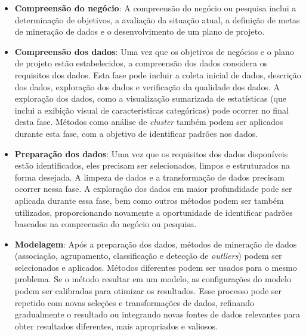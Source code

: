 \begin{itemize}
  \item 
\textbf{Compreensão do negócio}: A compreensão do negócio ou pesquisa inclui a determinação de objetivos, a avaliação da situação atual, a definição de metas de mineração de dados e o desenvolvimento de um plano de projeto.
  \item
\textbf{Compreensão dos dados}: Uma vez que os objetivos de negócios e o plano de projeto estão estabelecidos, a compreensão dos dados considera os requisitos dos dados. Esta fase pode incluir a coleta inicial de dados, descrição dos dados, exploração dos dados e verificação da qualidade dos dados. A exploração dos dados, como a visualização sumarizada de estatísticas (que inclui a exibição visual de características categóricas) pode ocorrer no final desta fase. Métodos como análise de \textit{cluster} também podem ser aplicados durante esta fase, com a objetivo de identificar padrões nos dados.
  \item
\textbf{Preparação dos dados}: Uma vez que os requisitos dos dados disponíveis estão identificados, eles precisam ser selecionados, limpos e estruturados na forma desejada. A limpeza de dados e a transformação de dados precisam ocorrer nessa fase. A exploração dos dados em maior profundidade pode ser aplicada durante essa fase, bem como outros métodos podem ser também utilizados, proporcionando novamente a oportunidade de identificar padrões baseados na compreensão do negócio ou pesquisa.
  \item
\textbf{Modelagem}: Após a preparação dos dados, métodos de mineração de dados (associação, agrupamento, classificação e detecção de \textit{outliers}) podem ser selecionados e aplicados. Métodos diferentes podem ser usados para o mesmo problema. Se o método resultar em um modelo, as configurações do modelo podem ser calibradas para otimizar os resultados. Esse processo pode ser repetido com novas seleções e transformações de dados, refinando gradualmente o resultado ou integrando novas fontes de dados relevantes para obter resultados diferentes, mais apropriados e valiosos.


\end{itemize}
